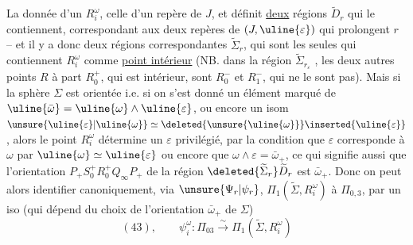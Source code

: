La donnée d'un $R_i^\omega$,  celle d'un repère  de $J$, et définit \uline{deux}  régions $\widetilde D_r$ qui le contiennent, correspondant aux deux repères de $(J,\uline{\varepsilon})$ qui prolongent $r$ -- et il y a donc deux régions correspondantes $\widetilde\Sigma_r$, qui sont les seules qui contiennent $R_i^\omega$ comme \uline{point intérieur} (NB. dans la région $\widetilde\Sigma_{r_\varepsilon}$ , les deux autres points $R$ à part $R_0^+$, qui est intérieur, sont $R_0^-$ et $R_1^-$, qui ne le sont pas). Mais si la sphère $\Sigma$ est orientée i.e. si on s'est donné un élément marqué \inserted{$\bar\omega_+$} de $\uline{\bar\omega}=\uline{\omega}\wedge\uline{\varepsilon}$, ou encore un isom $\unsure{\uline{\varepsilon}|\uline{\omega}}\simeq\deleted{\unsure{\uline{\omega}}}\inserted{\uline{\varepsilon}}$, alors le point $R_i^\omega$ détermine un $\varepsilon$ \inserted{$\in\uline{\varepsilon}$} privilégié, par la condition que $\varepsilon$ corresponde à $\omega$ par $\uline{\omega}\simeq\uline{\varepsilon}$ ou encore que $\omega\wedge\varepsilon=\bar\omega_+$, ce qui signifie aussi que l'orientation $P_+S_0^+R_0^+Q_\infty P_+$ de la région $\deleted{\widetilde\Sigma_r}\widetilde D_r$ est  $\bar\omega_+$. Donc on peut alors identifier canoniquement, via $\unsure{\Psi_r|\psi_r}$, $\Pi_1(\widetilde\Sigma,R_i^\omega)$ à $\Pi_{0,3}$, par un iso (qui dépend du choix de l'orientation $\bar\omega_+$ de $\Sigma$)
\[
(43),\qquad\psi_i^\omega:\Pi_{03}\xrightarrow{\sim}\Pi_1(\widetilde\Sigma,R_i^\omega)
\]

